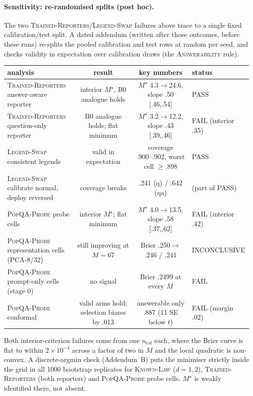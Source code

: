 \documentclass[11pt]{article}
\theoremstyle{definition}
\theoremstyle{remark}
\newcommand{\1}{\mathbf{1}}
\newcommand{\expname}[1]{\textsc{#1}}
\begin{document}
\paragraph{Sensitivity: re-randomised splits (post hoc).} The two \expname{Trained-Reporters}/\expname{Legend-Swap} failures above
trace to a single fixed calibration/test split. A dated addendum (written after those outcomes,
before these runs) re-splits the pooled calibration and test rows at random per seed, and checks
validity in expectation over calibration draws (the \expname{Answerability} rule).
\begin{center}\small
\begin{tabular}{lccl}
\toprule
analysis & result & key numbers & status\\
\midrule
\expname{Trained-Reporters} answer-aware reporter & interior $M^\star$, B0 analogue holds & $M^\star$ 4.3$\to$24.6, slope .50 [.46,.54] & PASS\\
\expname{Trained-Reporters} question-only reporter & B0 analogue holds; flat minimum & $M^\star$ 3.2$\to$12.2, slope .43 [.39,.46] & FAIL (interior .35)\\
\expname{Legend-Swap} consistent legends & valid in expectation & coverage .900--.902, worst cell $\ge$.898 & PASS\\
\expname{Legend-Swap} calibrate normal, deploy reversed & coverage breaks & .241 (q) / .642 (qa) & (part of PASS)\\
\expname{PopQA-Probe} probe cells & interior $M^\star$; flat minimum & $M^\star$ 4.0$\to$13.5, slope .58 [.37,.62] & FAIL (interior .42)\\
\expname{PopQA-Probe} representation cells (PCA-8/32) & still improving at $M=67$ & Brier .250$\to$.246 / .241 & INCONCLUSIVE\\
\expname{PopQA-Probe} prompt-only cells (stage 0) & no signal & Brier .2499 at every $M$ & FAIL\\
\expname{PopQA-Probe} conformal & valid arms hold; selection biases by .013 & answerable only .887 (11 SE below $t$) & FAIL (margin .02)\\
\bottomrule
\end{tabular}
\end{center}
Both interior-criterion failures come from one $n_{\mathrm{cal}}$ each, where the Brier curve is flat
to within $2\times10^{-4}$ across a factor of two in $M$ and the local quadratic is non-convex. A
discrete-argmin check (Addendum~B) puts the minimiser strictly inside the grid in all 1000
bootstrap replicates for \expname{Known-Law} ($d=1,2$), \expname{Trained-Reporters} (both reporters) and \expname{PopQA-Probe} probe cells. $M^\star$ is weakly
identified there, not absent.
\end{document}
